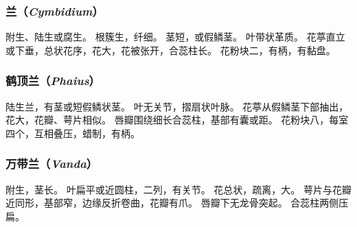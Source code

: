 \documentclass[11pt]{article}
\begin{document}
\begin{sloppypar}
\subsubsection{兰（\textit{Cymbidium}）}
附生、陆生或腐生。
根簇生，纤细。
茎短，或假鳞茎。
叶带状革质。
花葶直立或下垂，总状花序，花大，花被张开，合蕊柱长。
花粉块二，有柄，有黏盘。

\subsubsection{鹤顶兰（\textit{Phaius}）}
陆生兰，有茎或短假鳞状茎。
叶无关节，摺扇状叶脉。
花葶从假鳞茎下部抽出，花大，花瓣、萼片相似。
唇瓣围绕细长合蕊柱，基部有囊或距。
花粉块八，每室四个，互相叠压，蜡制，有柄。

\subsubsection{万带兰（\textit{Vanda}）}
附生，茎长。
叶扁平或近圆柱，二列，有关节。
花总状，疏离，大。
萼片与花瓣近同形，基部窄，边缘反折卷曲，花瓣有爪。
唇瓣下无龙骨突起。
合蕊柱两侧压扁。

\end{sloppypar}
\end{document}
